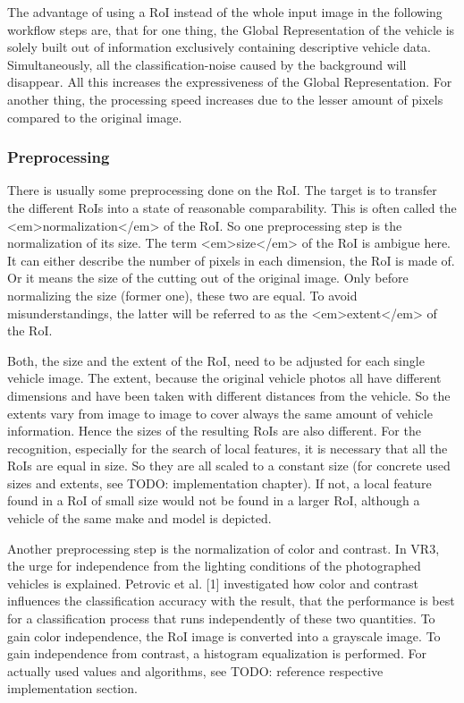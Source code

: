 The advantage of using a RoI instead of the whole input image in the following workflow steps are, that for one thing, the Global Representation of the vehicle is solely built out of information exclusively containing descriptive vehicle data. Simultaneously, all the classification-noise caused by the background will disappear. All this increases the expressiveness of the Global Representation. For another thing, the processing speed increases due to the lesser amount of pixels compared to the original image.

\subsubsection{Preprocessing}
There is usually some preprocessing done on the RoI. The target is to transfer the different RoIs into a state of reasonable comparability. This is often called the <em>normalization</em> of the RoI. So one preprocessing step is the normalization of its size. The term <em>size</em> of the RoI is ambigue here. It can either describe the number of pixels in each dimension, the RoI is made of. Or it means the size of the cutting out of the original image. Only before normalizing the size (former one), these two are equal. To avoid misunderstandings, the latter will be referred to as the <em>extent</em> of the RoI.

Both, the size and the extent of the RoI, need to be adjusted for each single vehicle image. The extent, because the original vehicle photos all have different dimensions and have been taken with different distances from the vehicle. So the extents vary from image to image to cover always the same amount of vehicle information. Hence the sizes of the resulting RoIs are also different. For the recognition, especially for the search of local features, it is necessary that all the RoIs are equal in size. So they are all scaled to a constant size (for concrete used sizes and extents, see TODO: implementation chapter). If not, a local feature found in a RoI of small size would not be found in a larger RoI, although a vehicle of the same make and model is depicted.

Another preprocessing step is the normalization of color and contrast. In VR3, the urge for independence from the lighting conditions of the photographed vehicles is explained. Petrovic et al. [1] investigated how color and contrast influences the classification accuracy with the result, that the performance is best for a classification process that runs independently of these two quantities. To gain color independence, the RoI image is converted into a grayscale image. To gain independence from contrast, a histogram equalization is performed. For actually used values and algorithms, see TODO: reference respective implementation section.

